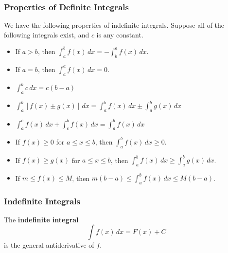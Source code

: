\subsubsection*{Properties of Definite Integrals}
We have the following properties of indefinite integrals.
Suppose all of the following integrals exist, and \(c\) is any constant.
\begin{itemize}
    \item If \(a>b\), then
    \(\displaystyle{\int_a^b f(x)\,dx=-\int_b^a f(x)\,dx}\).
    \item If \(a=b\), then
    \(\displaystyle{\int_a^a f(x)\,dx=0}\).
    \item \(\displaystyle{\int_a^b c\,dx=c(b-a)}\)
    \item \(\displaystyle{\int_a^b[f(x)\pm g(x)]\,dx
    =\int_a^b f(x)\,dx\pm \int_a^b g(x)\,dx}\)
    \item \(\displaystyle{\int_a^c f(x)\,dx+\int_c^b f(x)\,dx
    =\int_a^b f(x)\,dx}\)
    \item If \(f(x)\geq 0\) for \(a\leq x\leq b\),
    then \(\displaystyle{\int_a^b f(x)\,dx\geq 0}\).
    \item If \(f(x)\geq g(x)\) for \(a\leq x\leq b\),
    then \(\displaystyle{\int_a^b f(x)\,dx\geq \int_a^b g(x)\,dx}\).
    \item If \(m\leq f(x)\leq M\),
    then \(\displaystyle{m(b-a)\leq\int_a^b f(x)\,dx\leq M(b-a)}\).
\end{itemize}

\subsubsection*{Indefinite Integrals}
\begin{definition}
    The \textbf{indefinite integral} \[\int f(x)\,dx=F(x)+C\]
    is the general antiderivative of \(f\).
\end{definition}